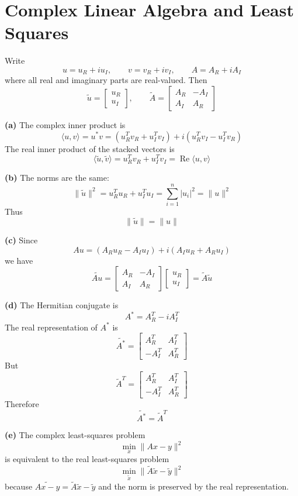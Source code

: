 \section{Complex Linear Algebra and Least Squares}

Write
\[
u=u_R+i u_I,\qquad v=v_R+i v_I,\qquad A=A_R+iA_I
\]
where all real and imaginary parts are real-valued. Then
\[
\tilde u=
\begin{bmatrix}u_R\\u_I\end{bmatrix},
\qquad
\tilde A=
\begin{bmatrix}
A_R&-A_I\\
A_I&A_R
\end{bmatrix}
\]

\textbf{(a)}
The complex inner product is
\[
\langle u,v\rangle
=u^*v
=(u_R^T v_R+u_I^T v_I)
+i(u_R^T v_I-u_I^T v_R)
\]
The real inner product of the stacked vectors is
\[
\langle \tilde u,\tilde v\rangle
=u_R^T v_R+u_I^T v_I
=\operatorname{Re}\langle u,v\rangle
\]

\textbf{(b)}
The norms are the same:
\[
\|\tilde u\|^2
=u_R^T u_R+u_I^T u_I
=\sum_{i=1}^n |u_i|^2
=\|u\|^2
\]
Thus
\[
\|\tilde u\|=\|u\|
\]

\textbf{(c)}
Since
\[
Au=(A_Ru_R-A_Iu_I)+i(A_Iu_R+A_Ru_I)
\]
we have
\[
\widetilde{Au}
=
\begin{bmatrix}
A_R&-A_I\\
A_I&A_R
\end{bmatrix}
\begin{bmatrix}
u_R\\u_I
\end{bmatrix}
=\tilde A\tilde u
\]

\textbf{(d)}
The Hermitian conjugate is
\[
A^*=A_R^T-iA_I^T
\]
The real representation of \(A^*\) is
\[
\widetilde{A^*}
=
\begin{bmatrix}
A_R^T&A_I^T\\
-A_I^T&A_R^T
\end{bmatrix}
\]
But
\[
\tilde A^T
=
\begin{bmatrix}
A_R^T&A_I^T\\
-A_I^T&A_R^T
\end{bmatrix}
\]
Therefore
\[
\widetilde{A^*}=\tilde A^T
\]

\textbf{(e)}
The complex least-squares problem
\[
\min_x \|Ax-y\|^2
\]
is equivalent to the real least-squares problem
\[
\min_{\tilde x}\|\tilde A\tilde x-\tilde y\|^2
\]
because \(\widetilde{Ax-y}=\tilde A\tilde x-\tilde y\) and the norm is preserved by the real representation.

